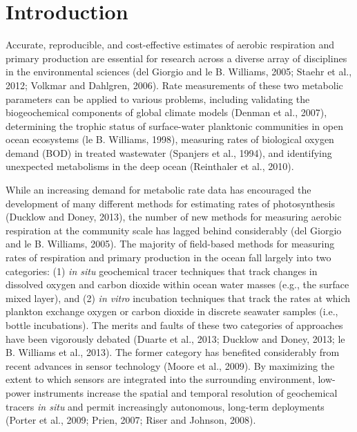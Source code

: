 \section{Introduction}
Accurate, reproducible, and cost-effective estimates of aerobic respiration and primary production are essential for research across a diverse array of disciplines in the environmental sciences (del Giorgio and le B. Williams, 2005; Staehr et al., 2012; Volkmar and Dahlgren, 2006). Rate measurements of these two metabolic parameters can be applied to various problems, including validating the biogeochemical components of global climate models (Denman et al., 2007), determining the trophic status of surface-water planktonic communities in open ocean ecosystems (le B. Williams, 1998), measuring rates of biological oxygen demand (BOD) in treated wastewater (Spanjers et al., 1994), and identifying unexpected metabolisms in the deep ocean (Reinthaler et al., 2010).

While an increasing demand for metabolic rate data has encouraged the development of many different methods for estimating rates of photosynthesis (Ducklow and Doney, 2013), the number of new methods for measuring aerobic respiration at the community scale has lagged behind considerably (del Giorgio and le B. Williams, 2005). The majority of field-based methods for measuring rates of respiration and primary production in the ocean fall largely into two categories: (1) \emph{in situ} geochemical tracer techniques that track changes in dissolved oxygen and carbon dioxide within ocean water masses (e.g., the surface mixed layer), and (2) \emph{in vitro} incubation techniques that track the rates at which plankton exchange oxygen or carbon dioxide in discrete seawater samples (i.e., bottle incubations). The merits and faults of these two categories of approaches have been vigorously debated (Duarte et al., 2013; Ducklow and Doney, 2013; le B. Williams et al., 2013). The former category has benefited considerably from recent advances in sensor technology (Moore et al., 2009). By maximizing the extent to which sensors are integrated into the surrounding environment, low-power instruments increase the spatial and temporal resolution of geochemical tracers \emph{in situ} and permit increasingly autonomous, long-term deployments (Porter et al., 2009; Prien, 2007; Riser and Johnson, 2008).

